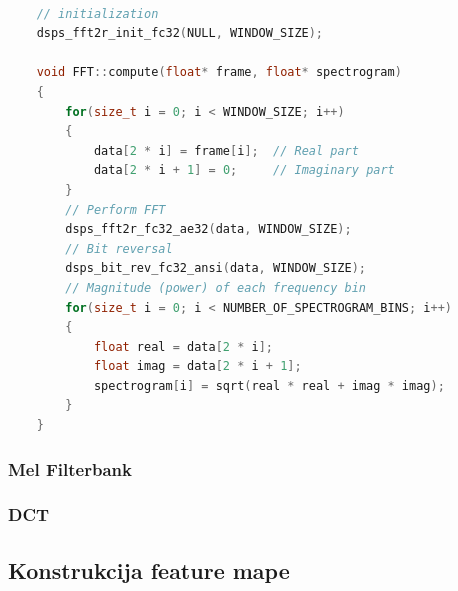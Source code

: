 \begin{lstlisting}[language=C++, caption=FFT]

    // initialization 
    dsps_fft2r_init_fc32(NULL, WINDOW_SIZE);

    void FFT::compute(float* frame, float* spectrogram)
    {
        for(size_t i = 0; i < WINDOW_SIZE; i++)
        {
            data[2 * i] = frame[i];  // Real part
            data[2 * i + 1] = 0;     // Imaginary part
        }
        // Perform FFT
        dsps_fft2r_fc32_ae32(data, WINDOW_SIZE);
        // Bit reversal
        dsps_bit_rev_fc32_ansi(data, WINDOW_SIZE);
        // Magnitude (power) of each frequency bin
        for(size_t i = 0; i < NUMBER_OF_SPECTROGRAM_BINS; i++)
        {
            float real = data[2 * i];
            float imag = data[2 * i + 1];
            spectrogram[i] = sqrt(real * real + imag * imag);
        }
    }
\end{lstlisting}
\label{code:fft}

\subsubsection{Mel Filterbank}






\subsubsection{DCT}
\subsection{Konstrukcija feature mape}

